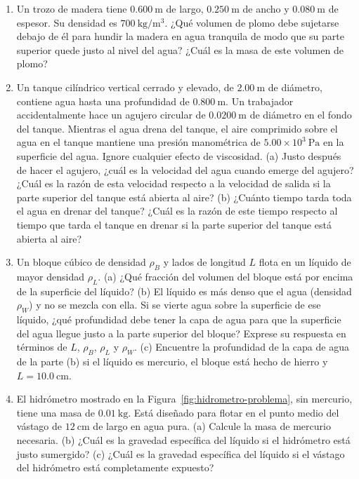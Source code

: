 \begin{enumerate}
\figuraBloqueTroncoFlotantes

\item Un trozo de madera tiene $0.600\ \mathrm{m}$ de largo, $0.250\ \mathrm{m}$ de ancho y $0.080\ \mathrm{m}$ de espesor. Su densidad es $700\ \mathrm{kg/m^3}$. ¿Qué volumen de plomo debe sujetarse debajo de él para hundir la madera en agua tranquila de modo que su parte superior quede justo al nivel del agua? ¿Cuál es la masa de este volumen de plomo?

\item Un tanque cilíndrico vertical cerrado y elevado, de $2.00\ \mathrm{m}$ de diámetro, contiene agua hasta una profundidad de $0.800\ \mathrm{m}$. Un trabajador accidentalmente hace un agujero circular de $0.0200\ \mathrm{m}$ de diámetro en el fondo del tanque. Mientras el agua drena del tanque, el aire comprimido sobre el agua en el tanque mantiene una presión manométrica de $5.00\times 10^3\ \mathrm{Pa}$ en la superficie del agua. Ignore cualquier efecto de viscosidad. (a) Justo después de hacer el agujero, ¿cuál es la velocidad del agua cuando emerge del agujero? ¿Cuál es la razón de esta velocidad respecto a la velocidad de salida si la parte superior del tanque está abierta al aire? (b) ¿Cuánto tiempo tarda toda el agua en drenar del tanque? ¿Cuál es la razón de este tiempo respecto al tiempo que tarda el tanque en drenar si la parte superior del tanque está abierta al aire?

\item Un bloque cúbico de densidad $\rho_B$ y lados de longitud $L$ flota en un líquido de mayor densidad $\rho_L$. (a) ¿Qué fracción del volumen del bloque está por encima de la superficie del líquido? (b) El líquido es más denso que el agua (densidad $\rho_W$) y no se mezcla con ella. Si se vierte agua sobre la superficie de ese líquido, ¿qué profundidad debe tener la capa de agua para que la superficie del agua llegue justo a la parte superior del bloque? Exprese su respuesta en términos de $L$, $\rho_B$, $\rho_L$ y $\rho_W$. (c) Encuentre la profundidad de la capa de agua de la parte (b) si el líquido es mercurio, el bloque está hecho de hierro y $L = 10.0\ \mathrm{cm}$.

\item El hidrómetro mostrado en la Figura~\ref{fig:hidrometro-problema}, sin mercurio, tiene una masa de $0.01\ \mathrm{kg}$. Está diseñado para flotar en el punto medio del vástago de $12\ \mathrm{cm}$ de largo en agua pura. (a) Calcule la masa de mercurio necesaria. (b) ¿Cuál es la gravedad específica del líquido si el hidrómetro está justo sumergido? (c) ¿Cuál es la gravedad específica del líquido si el vástago del hidrómetro está completamente expuesto?


\end{enumerate}
